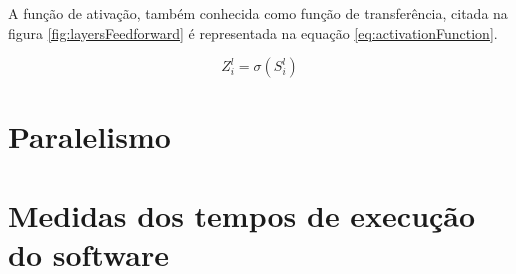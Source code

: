 \begin{apendicesenv}
	\par A função de ativação, também conhecida como função de transferência, citada na figura \ref{fig:layersFeedforward} é representada na equação \ref{eq:activationFunction}.
	
	\begin{equation}\label{eq:activationFunction}
		Z^l_i = \sigma(S^l_i)
	\end{equation}
	
	\chapter{Paralelismo}
		\par 
		
		\chapter{Medidas dos tempos de execução do software}
		
		
\end{apendicesenv}









